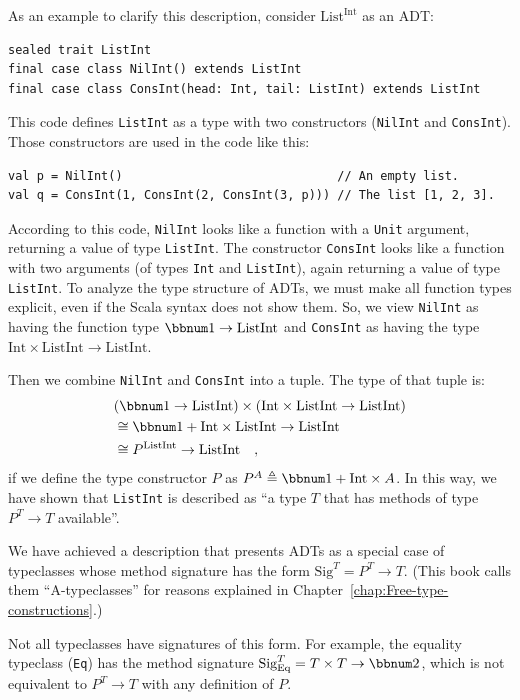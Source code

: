As an example to clarify this description, consider $\text{List}^{\text{Int}}$
as an ADT:
\begin{lstlisting}
sealed trait ListInt
final case class NilInt() extends ListInt
final case class ConsInt(head: Int, tail: ListInt) extends ListInt
\end{lstlisting}
This code defines \lstinline!ListInt! as a type with two constructors
(\lstinline!NilInt! and \lstinline!ConsInt!). Those constructors
are used in the code like this:
\begin{lstlisting}
val p = NilInt()                              // An empty list.
val q = ConsInt(1, ConsInt(2, ConsInt(3, p))) // The list [1, 2, 3].
\end{lstlisting}
According to this code, \lstinline!NilInt! looks like a function
with a \lstinline!Unit! argument, returning a value of type \lstinline!ListInt!.
The constructor \lstinline!ConsInt! looks like a function with two
arguments (of types \lstinline!Int! and \lstinline!ListInt!), again
returning a value of type \lstinline!ListInt!. To analyze the type
structure of ADTs, we must make all function types explicit, even
if the Scala syntax does not show them. So, we view \lstinline!NilInt!
as having the function type $\bbnum 1\rightarrow\text{ListInt}$ and
\lstinline!ConsInt! as having the type $\text{Int}\times\text{ListInt}\rightarrow\text{ListInt}$.

Then we combine \lstinline!NilInt! and \lstinline!ConsInt! into
a tuple. The type of that tuple is:
\begin{align*}
 & (\bbnum 1\rightarrow\text{ListInt})\times(\text{Int}\times\text{ListInt}\rightarrow\text{ListInt})\\
 & \cong\bbnum 1+\text{Int}\times\text{ListInt}\rightarrow\text{ListInt}\\
 & \cong P^{\text{ListInt}}\rightarrow\text{ListInt}\quad,
\end{align*}
if we define the type constructor $P$ as $P^{A}\triangleq\bbnum 1+\text{Int}\times A$.
In this way, we have shown that \lstinline!ListInt! is described
as \textsf{``}a type $T$ that has methods of type $P^{T}\rightarrow T$ available\textsf{''}.

We have achieved a description that presents ADTs as a special case
of typeclasses whose method signature has the form $\text{Sig}^{T}=P^{T}\rightarrow T$.
(This book calls them \textsf{``}A-typeclasses\textsf{''} for reasons explained in
Chapter~\ref{chap:Free-type-constructions}.)

Not all typeclasses have signatures of this form. For example, the
equality typeclass (\lstinline!Eq!) has the method signature $\text{Sig}_{\text{Eq}}^{T}=T\times T\rightarrow\bbnum 2$,
which is not equivalent to $P^{T}\rightarrow T$ with any definition
of $P$.

